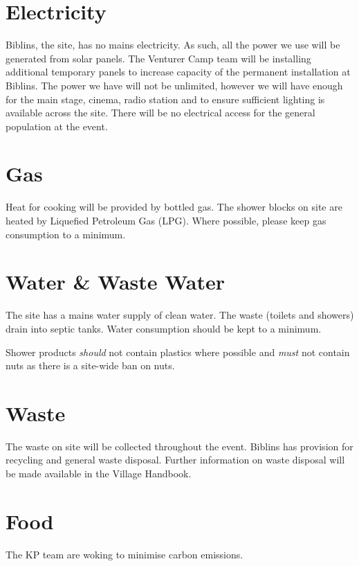 \documentclass[a4paper, 11pt]{report}
\newcommand{\nl}{\newline}
\begin{document}
\section{Electricity}
Biblins, the site, has no mains electricity. As such, all the power we use will be generated from solar panels. The Venturer Camp team will be installing additional temporary panels to increase capacity of the permanent installation at Biblins. The power we have will not be unlimited, however we will have enough for the main stage, cinema, radio station and to ensure sufficient lighting is available across the site. There will be no electrical access for the general population at the event.

\section{Gas}
Heat for cooking will be provided by bottled gas. The shower blocks on site are heated by Liquefied Petroleum Gas (LPG). Where possible, please keep gas consumption to a minimum. 

\section{Water \& Waste Water}
The site has a mains water supply of clean water. The waste (toilets and showers) drain into septic tanks. Water consumption should be kept to a minimum. \nl

Shower products \textit{should} not contain plastics where possible and \textit{must} not contain nuts as there is a site-wide ban on nuts.

\section{Waste}
The waste on site will be collected throughout the event. Biblins has provision for recycling and general waste disposal. Further information on waste disposal will be made available in the Village Handbook. 

\section{Food}
The KP team are woking to minimise carbon emissions.
\end{document}
